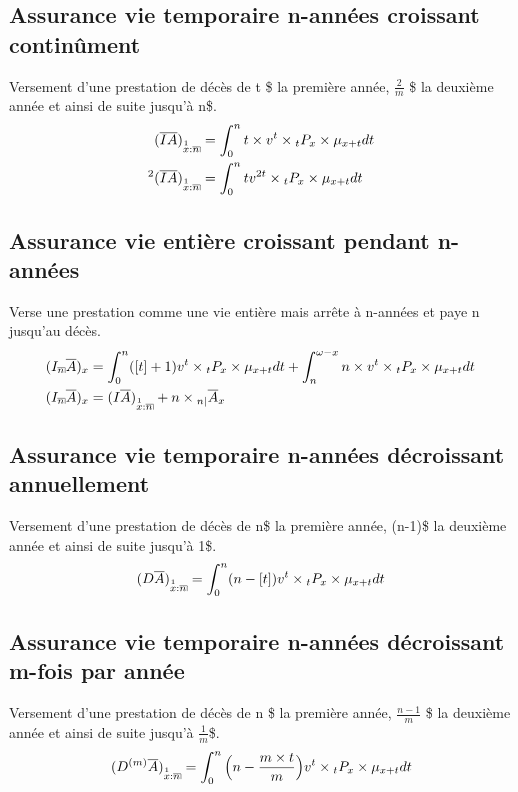 \documentclass[11pt,french]{report}
\makeatletter
\DeclareRobustCommand{\annuity}[1]{%
\def\arraystretch{0}%
\setlength\arraycolsep{.7pt}%
\setlength\arrayrulewidth{.3pt}%
\begin{array}[b]{@{}c|}\hline
\\[\arraycolsep]%
\scriptstyle #1%
\end{array}%
}
\newcommand{\indiceGauche}[2]{{\vphantom{#2}}_{#1}#2}
\makeatother
\begin{document}
\subsection{Assurance vie temporaire n-années croissant continûment}
Versement d'une prestation de décès de t \$ la première année, $\frac{2}{m}$ \$ la deuxième année et ainsi de suite jusqu'à n\$.
\begin{align*}
(\overline{IA})_{\overset{1}{x}:\annuity{n}} &= \int_{0}^{n} t\times v^t \times \indiceGauche{t}{P}_{x}\times \mu_{x+t}dt \\
{}^2(\overline{IA})_{\overset{1}{x}:\annuity{n}} &= \int_{0}^{n}t v^{2t} \times \indiceGauche{t}{P}_{x}\times \mu_{x+t}dt \\
\end{align*}

\subsection{Assurance vie  entière croissant pendant n-années}
Verse une prestation comme une vie entière mais arrête à n-années et paye n jusqu'au décès.
\begin{align*}
(I_{\annuity{n}}\overline{A})_{x} &= \int_{0}^{n}([t] +1 )v^t \times \indiceGauche{t}{P}_{x} \times\mu_{x+t}dt + \int_{n}^{\omega - x}n \times v^t \times \indiceGauche{t}{P}_{x} \times\mu_{x+t}dt \\
(I_{\annuity{n}}\overline{A})_{x} &= (I\overline{A})_{\overset{1}{x}:\annuity{n}} + n \times \indiceGauche{n|}{\overline{A}}_x\\
\end{align*}

\subsection{Assurance vie  temporaire n-années décroissant annuellement}
Versement d'une prestation de décès de n\$ la première année, (n-1)\$ la deuxième année et ainsi de suite jusqu'à 1\$.
\begin{align*}
(D\overline{A})_{\overset{1}{x}:\annuity{n}} &= \int_{0}^{n}(n - [t] )v^t \times \indiceGauche{t}{P}_{x} \times\mu_{x+t}dt \\
\end{align*}

\subsection{Assurance vie temporaire n-années décroissant m-fois par année}
Versement d'une prestation de décès de n \$ la première année, $\frac{n-1}{m}$ \$ la deuxième année et ainsi de suite jusqu'à $\frac{1}{m}$\$.
\begin{align*}
(D^{(m)}\overline{A})_{\overset{1}{x}:\annuity{n}} &= \int_{0}^{n}\Big(n - \frac{m \times t}{m}\Big)v^t \times \indiceGauche{t}{P}_{x}\times \mu_{x+t}dt \\
\end{align*}
\end{document}
